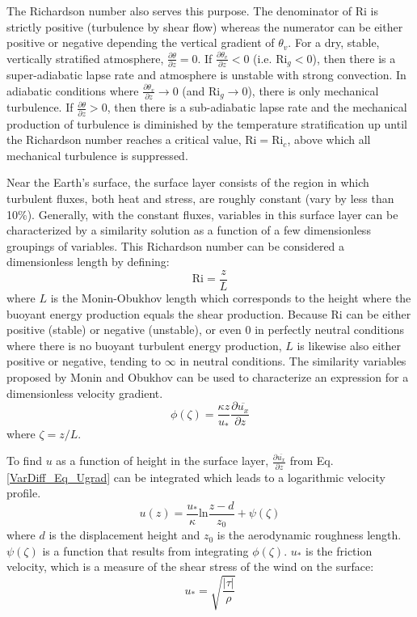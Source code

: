 The Richardson number also serves this purpose.
The denominator of $\mathrm{Ri}$ is strictly positive (turbulence by shear flow) whereas the numerator can be either
positive or negative depending the vertical gradient of $\theta_v$. For a dry, stable, vertically
stratified atmosphere, $\frac{\partial \theta}{\partial z}=0$.
If $\frac{\partial \theta_v}{\partial z}<0$ (i.e. $\mathrm{Ri}_g<0$), then there is a super-adiabatic lapse rate
and atmosphere is unstable with strong convection. In adiabatic conditions where
$\frac{\partial \theta_v}{\partial z} \rightarrow 0$ (and $\mathrm{Ri}_g \rightarrow 0$),
there is only mechanical turbulence. If $\frac{\partial \theta}{\partial z}>0$, then there
is a sub-adiabatic lapse rate and the mechanical production of turbulence is diminished by
the temperature stratification up until the Richardson number reaches a critical value,
$\mathrm{Ri} = \mathrm{Ri}_c$, above which all mechanical turbulence is suppressed.

Near the Earth's surface, the surface layer consists of the region in which turbulent fluxes,
both heat and stress, are roughly constant (vary by less than 10\%). Generally, with the constant
fluxes, variables in this surface layer can be characterized by a similarity solution as a function
of a few dimensionless groupings of variables. This Richardson number can be considered a dimensionless
length by defining:
\begin{equation}\label{VarDiff_Eq_ScaleHeight}
\mathrm{Ri} = \frac{z}{L}
\end{equation}
where $L$ is the Monin-Obukhov length which corresponds to the height where the buoyant energy production
equals the shear production. Because $\mathrm{Ri}$ can be either positive (stable) or negative (unstable), or
even 0 in perfectly neutral conditions where there is no buoyant turbulent energy production, $L$ is likewise
also either positive or negative, tending to $\infty$ in neutral conditions. 
The similarity variables proposed by Monin and Obukhov can be used to characterize an expression for 
a dimensionless velocity gradient.
\begin{equation}\label{VarDiff_Eq_Ugrad}
\phi(\zeta) = \frac{\kappa z}{u_*} \frac{\partial \overline{u_x}}{\partial z}  %
\end{equation}
where $\zeta = z/L$.

To find $u$ as a function of height in the surface layer, $\frac{\partial \overline{u_x}}{\partial z}$
from Eq. \ref{VarDiff_Eq_Ugrad} can be integrated
which leads to a logarithmic velocity profile.
\begin{equation}\label{VarDiff_Eq_Ulog}
u(z) = \frac{u_{*}}{\kappa} \mathrm{ln} \frac{z-d}{z_0} + \psi (\zeta)
\end{equation}
where $d$ is the displacement height and $z_0$ is the aerodynamic roughness length. $\psi (\zeta)$ is
a function that results from integrating $\phi(\zeta)$.
$u_{*}$ is the friction velocity, which is a measure of the shear stress of the wind on the surface:
\begin{equation}\label{VarDiff_Eq_Ustar}
u_{*} = \sqrt{\frac{|\tau|}{\rho}}
\end{equation}

